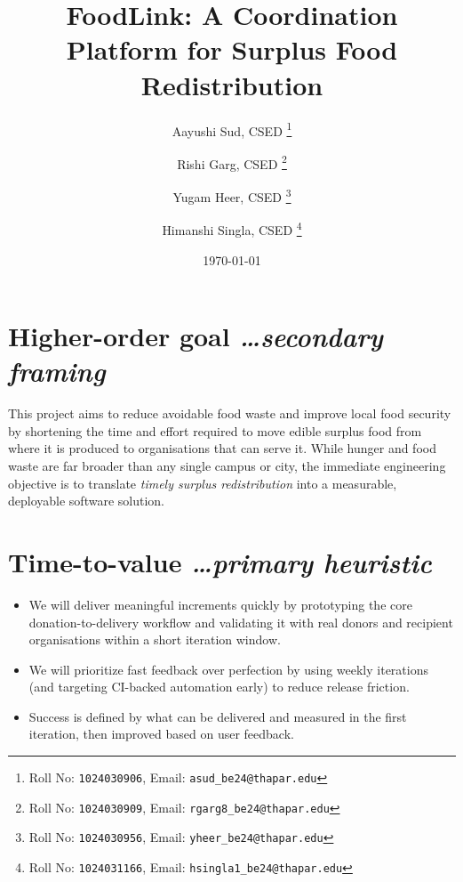 \documentclass[11pt,a4paper]{article}
\title{FoodLink: A Coordination Platform for Surplus
  Food Redistribution}
\author{
  Aayushi Sud, CSED%
  \thanks{Roll No: \texttt{1024030906}, %
    Email: \texttt{asud\_be24@thapar.edu}}
  \and
  Rishi Garg, CSED%
  \thanks{Roll No: \texttt{1024030909}, %
    Email: \texttt{rgarg8\_be24@thapar.edu}}
  \and
  Yugam Heer, CSED%
  \thanks{Roll No: \texttt{1024030956}, %
    Email: \texttt{yheer\_be24@thapar.edu}}
  \and
  Himanshi Singla, CSED%
  \thanks{Roll No: \texttt{1024031166}, %
    Email: \texttt{hsingla1\_be24@thapar.edu}}
}
\date{\today}
\newcommand{\BvrHint}[1]{%
  {\normalfont\normalsize\itshape\hfill #1}}
\begin{document}
\maketitle

\section{Higher-order goal%
  \BvrHint{\ldots secondary framing}}
This project aims to reduce avoidable food waste and
improve local food security by shortening the time and
effort required to move edible surplus food from where
it is produced to organisations that can serve it.
While hunger and food waste are far broader than any
single campus or city, the immediate engineering
objective is to translate \emph{timely surplus
  redistribution} into a measurable, deployable software
solution.

\section{Time-to-value %
\BvrHint{\ldots primary heuristic}}
\begin{itemize}[leftmargin=0.7cm]
    \item We will deliver meaningful increments quickly by prototyping the core donation-to-delivery workflow and validating it with real donors and recipient organisations within a short iteration window.
    \item We will prioritize fast feedback over perfection by using weekly iterations (and targeting CI-backed automation early) to reduce release friction.
    \item Success is defined by what can be delivered and measured in the first iteration, then improved based on user feedback.
\end{itemize}
\end{document}
